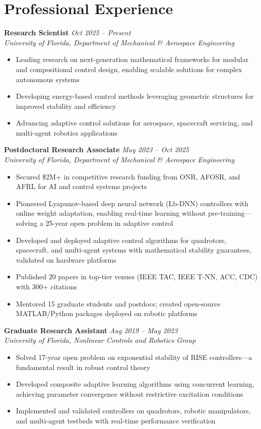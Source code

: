 \documentclass[10pt, letterpaper]{article}
\begin{document}
    \section{Professional Experience}

\textbf{Research Scientist} \hfill \textit{Oct 2025 -- Present}\\
\textit{University of Florida, Department of Mechanical \& Aerospace Engineering}
\begin{itemize}[leftmargin=20pt, itemsep=1pt]
    \item Leading research on next-generation mathematical frameworks for modular and compositional control design, enabling scalable solutions for complex autonomous systems
    \item Developing energy-based control methods leveraging geometric structures for improved stability and efficiency
    \item Advancing adaptive control solutions for aerospace, spacecraft servicing, and multi-agent robotics applications
\end{itemize}

\textbf{Postdoctoral Research Associate} \hfill \textit{May 2023 -- Oct 2025}\\
\textit{University of Florida, Department of Mechanical \& Aerospace Engineering}
\begin{itemize}[leftmargin=20pt, itemsep=1pt]
    \item Secured \$2M+ in competitive research funding from ONR, AFOSR, and AFRL for AI and control systems projects
    \item Pioneered Lyapunov-based deep neural network (Lb-DNN) controllers with online weight adaptation, enabling real-time learning without pre-training—solving a 25-year open problem in adaptive control
    \item Developed and deployed adaptive control algorithms for quadrotors, spacecraft, and multi-agent systems with mathematical stability guarantees, validated on hardware platforms
    \item Published 20 papers in top-tier venues (IEEE TAC, IEEE T-NN, ACC, CDC) with 300+ citations
    \item Mentored 15 graduate students and postdocs; created open-source MATLAB/Python packages deployed on robotic platforms
\end{itemize}

\textbf{Graduate Research Assistant} \hfill \textit{Aug 2019 -- May 2023}\\
\textit{University of Florida, Nonlinear Controls and Robotics Group}
\begin{itemize}[leftmargin=20pt, itemsep=1pt]
    \item Solved 17-year open problem on exponential stability of RISE controllers—a fundamental result in robust control theory
    \item Developed composite adaptive learning algorithms using concurrent learning, achieving parameter convergence without restrictive excitation conditions
    \item Implemented and validated controllers on quadrotors, robotic manipulators, and multi-agent testbeds with real-time performance verification
\end{itemize}
\end{document}
